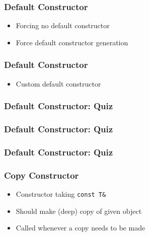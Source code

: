 \documentclass{../ucll-slides}
\begin{document}
\begin{frame}
  \frametitle{Default Constructor}
  \begin{itemize}
    \item Forcing no default constructor
          \vskip1mm
    \item Force default constructor generation
          \vskip1mm
  \end{itemize}
\end{frame}

\begin{frame}
  \frametitle{Default Constructor}
  \begin{itemize}
    \item Custom default constructor
          \vskip1mm
  \end{itemize}
\end{frame}

\begin{frame}
  \frametitle{Default Constructor: Quiz}
\end{frame}

\begin{frame}
  \frametitle{Default Constructor: Quiz}
\end{frame}

\begin{frame}
  \frametitle{Default Constructor: Quiz}
\end{frame}

\begin{frame}
  \frametitle{Copy Constructor}
  \begin{itemize}
    \item Constructor taking {\tt const T\&}
    \item Should make (deep) copy of given object
    \item Called whenever a copy needs to be made
  \end{itemize}
  \vskip5mm
\end{frame}
\end{document}
